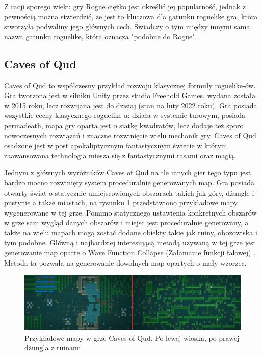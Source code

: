 \documentclass[12pt,twoside]{article}
\begin{document}
Z racji sporego wieku gry Rogue ciężko jest określić jej popularność, jednak z pewnością można stwierdzić, że jest to kluczowa dla gatunku roguelike gra, która stworzyła podwaliny jego głównych cech. Świadczy o tym między innymi sama nazwa gatunku roguelike, która oznacza "podobne do Rogue".



\subsection{Caves of Qud}
Caves of Qud to współczesny przykład rozwoju klasycznej formuły roguelike-ów. Gra tworzona jest w silniku Unity przez studio Freehold Games, wydana została w 2015 roku, lecz rozwijana jest do dzisiaj (stan na luty 2022 roku). Gra posiada wszystkie cechy klasycznego roguelike-a: działa w systemie turowym, posiada permadeath, mapa gry oparta jest o siatkę kwadratów, lecz dodaje też sporo nowoczesnych rozwiązań i znaczne rozwinięcie wielu mechanik gry. Caves of Qud osadzone jest w post apokaliptycznym fantastycznym świecie w którym zaawansowana technologia miesza się z fantastycznymi rasami oraz magią.

Jednym z głównych wyróżników Caves of Qud na tle innych gier tego typu jest bardzo mocno rozwinięty system proceduralnie generowanych map. Gra posiada otwarty świat o statycznie umiejscowionych obszarach takich jak góry, dżungle i pustynie a także miastach, na rysunku \ref{CoQ:scr1} przedstawiono przykładowe mapy wygenerowane w tej grze. Pomimo statycznego ustawienia konkretnych obszarów w grze sam wygląd danych obszarów i miejsc jest proceduralnie generowany, a także na wielu mapach mogą zostać dodane obiekty takie jak ruiny, obozowiska i tym podobne. Główną i najbardziej interesującą metodą uzywaną w tej grze jest generowanie map oparte o Wave Function Collapse (Załamanie funkcji falowej) \cite{coq_wfc}. Metoda ta pozwala na generowanie dowolnych map opartych o mały wzorzec.

\FloatBarrier
\begin{figure}[h]
	\centering
	\includegraphics[width=16cm]{images/caves_of_qud/scr1.png}
	\caption{Przykładowe mapy w grze Caves of Qud. Po lewej wioska, po prawej dżungla z ruinami}
	\label{CoQ:scr1}
\end{figure}
\FloatBarrier
\end{document}

